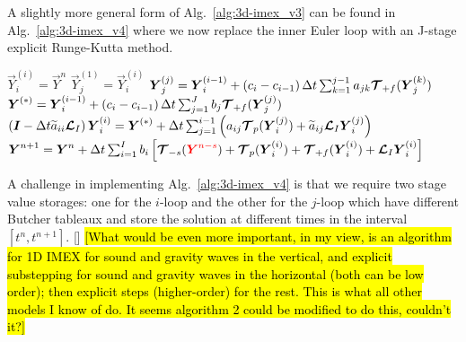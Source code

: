 \documentclass{report}
\begin{document}
A slightly more general form of Alg.\ \ref{alg:3d-imex_v3} can be found in Alg.\ \ref{alg:3d-imex_v4} where we now replace the inner Euler loop with an J-stage explicit Runge-Kutta method. 
\begin{algorithm}
\label{alg:3d-imex_v4}
\begin{algorithmic}
\State
{}
\State $\vec{Y}_i^{(i)}=\vec{Y}^{n}$
\State $\vec{Y}_j^{(1)}=\vec{Y}_i^{(i)}$
\State $\boldsymbol{{Y}}_j^{(j)}=\boldsymbol{{Y}}_i^{(i-1)} + \left(c_i - c_{i-1} \right) \Delta t \sum_{k=1}^{j-1} a_{jk} \boldsymbol{{\mathcal{T}}}_{+f}(\boldsymbol{{Y}}_j^{(k)})$
\EndFor %
\State $\boldsymbol{{Y}}^{(*)}=\boldsymbol{{Y}}_i^{(i-1)} + \left(c_i - c_{i-1} \right) \Delta t \sum_{j=1}^{J} b_j \boldsymbol{{\mathcal{T}}}_{+f}(\boldsymbol{{Y}}_j^{(j)})$
\State $\left( \boldsymbol{{I}} - \Delta t \widetilde{a}_{ii} \boldsymbol{{\mathcal{L}}}_I \right) \boldsymbol{{Y}}_i^{(i)}=\boldsymbol{{Y}}^{(*)} + \Delta t \sum_{j=1}^{i-1} \left( a_{ij} \boldsymbol{{\mathcal{T}}}_{p}(\boldsymbol{{Y}}_i^{(j)}) + \widetilde{a}_{ij} \boldsymbol{{\mathcal{L}}}_I \boldsymbol{{Y}}_i^{(j)} \right)$
\EndFor %
\State $\boldsymbol{{Y}}^{n+1}=\boldsymbol{{Y}}^{n} + \Delta t \sum_{i=1}^{I} b_i \left[ \boldsymbol{{\mathcal{T}}}_{-s}(\textcolor{red}{\boldsymbol{{Y}}^{n-s}}) + \boldsymbol{{\mathcal{T}}}_{p}(\boldsymbol{{Y}}_i^{(i)}) + 
\boldsymbol{{\mathcal{T}}}_{+f}(\boldsymbol{{Y}}_i^{(i)}) + 
\boldsymbol{{\mathcal{L}}}_I \boldsymbol{{Y}}_i^{(i)} \right]$
\EndFunction
\end{algorithmic}
\end{algorithm}
A challenge in implementing Alg.\ \ref{alg:3d-imex_v4} is that we require two stage value storages: one for the $i$-loop and the other for the $j$-loop which have different Butcher tableaux and store the solution at different times in the interval $[t^n,t^{n+1}]$.
[]
\hl{[What would be even more important, in my view, is an algorithm for 1D IMEX for sound and gravity waves in the vertical, and explicit substepping for sound and gravity waves in the horizontal (both can be low order); then explicit steps (higher-order) for the rest. This is what all other models I know of do. It seems algorithm 2 could be modified to do this, couldn't it?]}
\end{document}
